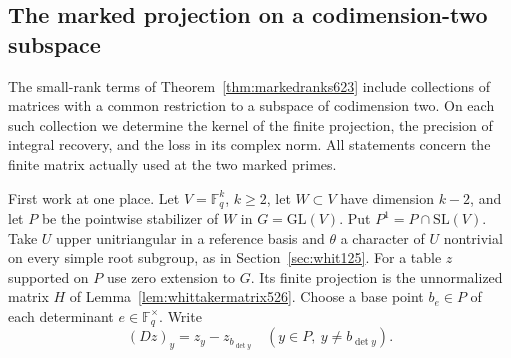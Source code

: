 \documentclass[a4paper,11pt]{article}
\theoremstyle{definition}
\theoremstyle{remark}
\numberwithin{equation}{section}
\begin{document}
\subsection{The marked projection on a codimension-two subspace}
\label{sec:codimtwo624}

The small-rank terms of Theorem~\ref{thm:markedranks623} include
collections of matrices with a common restriction to a subspace
of codimension two. On each such collection we determine the kernel
of the finite projection, the precision of integral recovery, and
the loss in its complex norm. All statements concern the finite
matrix actually used at the two marked primes.

First work at one place. Let \(V=\mathbb F_q^k\), \(k\ge2\), let
\(W\subset V\) have dimension \(k-2\), and let \(P\) be the
pointwise stabilizer of \(W\) in \(G=\mathrm{GL}(V)\). Put
\(P^1=P\cap\mathrm{SL}(V)\). Take \(U\) upper unitriangular in a
reference basis and \(\theta\) a character of \(U\) nontrivial on
every simple root subgroup, as in Section~\ref{sec:whit125}.
For a table \(z\) supported on \(P\) use zero extension to \(G\).
Its finite projection is the unnormalized matrix \(H\) of
Lemma~\ref{lem:whittakermatrix526}. Choose a base point \(b_e\in P\)
of each determinant \(e\in\mathbb F_q^\times\). Write
\[
   (Dz)_y=z_y-z_{b_{\det y}}\quad (y\in P,\ y\ne b_{\det y}).
\]
\end{document}
